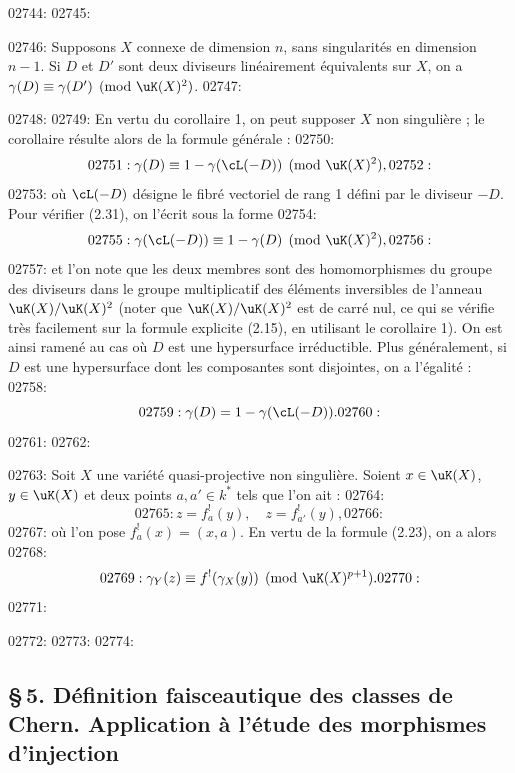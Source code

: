 02744: 
02745: \begin{corollaire}\label{cor:2.10.1}
02746: Supposons $X$ connexe de dimension $n$, sans singularit\'es en dimension $n - 1$. Si $D$ et $D'$ sont deux diviseurs lin\'eairement \'equivalents sur $X$, on a $\gamma(D) \equiv \gamma(D') \pmod{\uK(X)^2}$.
02747: \end{corollaire}
02748: 
02749: En vertu du corollaire 1, on peut supposer $X$ non singuli\`ere ; le corollaire r\'esulte alors de la formule g\'en\'erale :
02750: \begin{equation}\label{eq:2.31}
02751: \gamma(D) \equiv 1 - \gamma(\cL(-D)) \pmod{\uK(X)^2},
02752: \end{equation}
02753: o\`u $\cL(-D)$ d\'esigne le fibr\'e vectoriel de rang 1 d\'efini par le diviseur $-D$. Pour v\'erifier (2.31), on l'\'ecrit sous la forme
02754: \begin{equation}\label{eq:2.31bis}
02755: \gamma(\cL(-D)) \equiv 1 - \gamma(D) \pmod{\uK(X)^2},
02756: \end{equation}
02757: et l'on note que les deux membres sont des homomorphismes du groupe des diviseurs dans le groupe multiplicatif des \'el\'ements inversibles de l'anneau $\uK(X)/\uK(X)^2$ (noter que $\uK(X)/\uK(X)^2$ est de carr\'e nul, ce qui se v\'erifie tr\`es facilement sur la formule explicite (2.15), en utilisant le corollaire 1). On est ainsi ramen\'e au cas o\`u $D$ est une hypersurface irr\'eductible. Plus g\'en\'eralement, si $D$ est une hypersurface dont les composantes sont disjointes, on a l'\'egalit\'e :
02758: \begin{equation}\label{eq:2.32}
02759: \gamma(D) = 1 - \gamma(\cL(-D)).
02760: \end{equation}
02761: 
02762: \begin{theoreme}\label{thm:2.12}
02763: Soit $X$ une vari\'et\'e quasi-projective non singuli\`ere. Soient $x \in \uK(X)$, $y \in \uK(X)$ et deux points $a, a' \in k^*$ tels que l'on ait :
02764: \[
02765: z = f_a^!(y), \quad z = f_{a'}^!(y),
02766: \]
02767: o\`u l'on pose $f_a^!(x) = (x, a)$. En vertu de la formule (2.23), on a alors
02768: \[
02769: \gamma_Y(z) \equiv f^!(\gamma_X(y)) \pmod{\uK(X)^{p+1}}.
02770: \]
02771: \end{theoreme}
02772: 
02773: %
02774: \subsection*{\S\,5. D\'efinition faisceautique des classes de Chern. Application \`a l'\'etude des morphismes d'injection}
